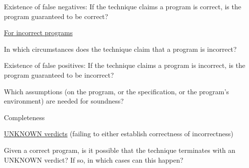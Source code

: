 \documentclass[a4paper]{article}
\begin{document}
\begin{minipage}[t]{0.16\linewidth}
\begin{betterlist}
\begin{betterlist}
\begin{betterlist}
				\item Existence of false negatives: If the technique claims a program is correct, is the program guaranteed to be correct?

			\end{betterlist}
			\item \underline{For incorrect programs}
			\begin{betterlist}
				\item In which circumstances does the technique claim that a program is incorrect?

				\item Existence of false positives: If the technique claims a program is incorrect, is the program guaranteed to be incorrect?

			\end{betterlist}
			\item Which assumptions (on the program, or the specification, or the program’s environment) are needed for soundness?
			\framebox[0.90\textwidth][l]{\parbox{0.85\textwidth}{
					\begin{betterlist}
						\item not in lecture
					\end{betterlist}
				}}
		\end{betterlist}
		\item \alert{Completeness}
		\begin{betterlist}
			\item \underline{UNKNOWN verdicts} (failing to either establish correctness of incorrectness)
			\begin{betterlist}
				\item Given a correct program, is it possible that the technique terminates with an UNKNOWN verdict? If so, in which cases can this happen?


\end{betterlist}
\end{betterlist}
\end{betterlist}
\end{minipage}
\end{document}
